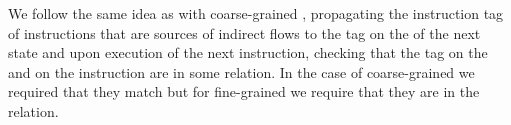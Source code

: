 
We follow the same idea as with coarse-grained \CFI{},
propagating the
instruction tag of instructions that are sources of indirect flows to
the tag on the \pc of the next state and upon execution of the next
instruction, checking that the tag on the \pc and on the instruction
are in some relation. In the case of coarse-grained \CFI we required
that they match but for fine-grained \CFI we require that they are in
the \CFG relation.


